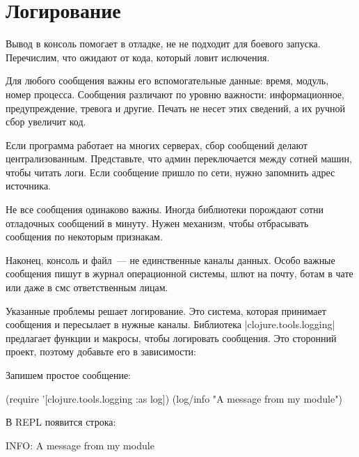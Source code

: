\section{Логирование}

Вывод в консоль помогает в отладке, не не подходит для боевого
запуска. Перечислим, что ожидают от кода, который ловит ислючения.

Для любого сообщения важны его вспомогательные данные: время, модуль, номер
процесса. Сообщения различают по уровню важности: информационное,
предупреждение, тревога и другие. Печать не несет этих сведений, а их ручной
сбор увеличит код.

Если программа работает на многих серверах, сбор сообщений делают
централизованным. Представьте, что админ переключается между сотней машин, чтобы
читать логи. Если сообщение пришло по сети, нужно запомнить адрес источника.

Не все сообщения одинаково важны. Иногда библиотеки порождают сотни отладочных
сообщений в минуту. Нужен механизм, чтобы отбрасывать сообщения по некоторым
признакам.

Наконец, консоль и файл~--- не единственные каналы данных. Особо важные
сообщения пишут в журнал операционной системы, шлют на почту, ботам в чате или
даже в смс ответственным лицам.

Указанные проблемы решает логирование. Это система, которая принимает сообщения
и пересылает в нужные каналы. Библиотека \spverb|clojure.tools.logging|
предлагает функции и макросы, чтобы логировать сообщения. Это сторонний проект,
поэтому добавьте его в зависимости:

\begin{english}
  \begin{clojure}
  \end{clojure}
\end{english}

\noindent
Запишем простое сообщение:

\begin{english}
  \begin{clojure}
(require '[clojure.tools.logging :as log])
(log/info "A message from my module")
  \end{clojure}
\end{english}

\noindent
В REPL появится строка:

\begin{english}
  \begin{text}
INFO: A message from my module
  \end{text}
\end{english}

